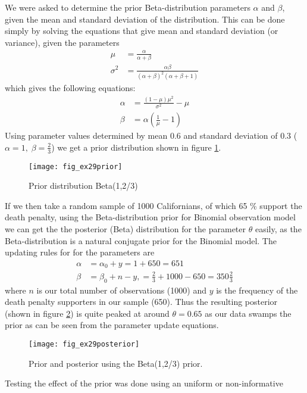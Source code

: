 \documentclass[a4paper]{article}
\begin{document}
We were asked to determine the prior Beta-distribution
parameters $\alpha$ and $\beta$, given the mean and standard deviation of the
distribution. This can be done simply by solving the equations that give mean
and standard deviation (or variance), given the parameters
\begin{align*}
    \mu &= \frac{\alpha}{\alpha+\beta}\!  \\
    \sigma^2 &= \frac{\alpha\beta}{(\alpha+\beta)^2(\alpha+\beta+1)}\!
\end{align*}
which gives the following equations:
\begin{align*}
\alpha &= \frac{(1-\mu)\mu^2}{\sigma^2}-\mu\\
\beta &= \alpha(\frac{1}{\mu}-1)
\end{align*}
Using parameter values determined by mean 0.6 and standard deviation of 0.3
($\alpha=1,\;\beta=\frac{2}{3}$) we get a prior distribution shown in figure
\ref{fig:prior}.
\begin{figure}[ht]
  \begin{center}
      \texttt{[image: fig\_ex29prior]}
    \caption{Prior distribution Beta(1,2/3)}\label{fig:prior}   
 \end{center}
\end{figure}
If we then take a random sample of 1000 Californians, of which 65 \% support
the death penalty, using the Beta-distribution prior for Binomial observation
model we can get the the posterior (Beta) distribution for the parameter
$\theta$ easily, as the Beta-distribution is a natural conjugate prior for the
Binomial model. The updating rules for for the parameters are
\begin{align*}
    \alpha &= \alpha_0 + y = 1 + 650 = 651\\
    \beta &= \beta_0 + n -y, = \frac{2}{3} +1000 -650 = 350\frac{2}{3}
\end{align*}
where $n$ is our total number of observations (1000) and $y$ is the frequency
of the death penalty supporters in our sample (650). Thus the resulting
posterior (shown in figure \ref{fig:post1}) is quite peaked at around
$\theta=0.65$ as our data swamps the prior as can be seen from the parameter
update equations.
\begin{figure}[ht]
  \begin{center}
      \texttt{[image: fig\_ex29posterior]}
    \caption{Prior and posterior using the Beta(1,2/3) prior.}\label{fig:post1}   
 \end{center}
\end{figure}
Testing the effect of the prior was done using an uniform or non-informative
\end{document}
